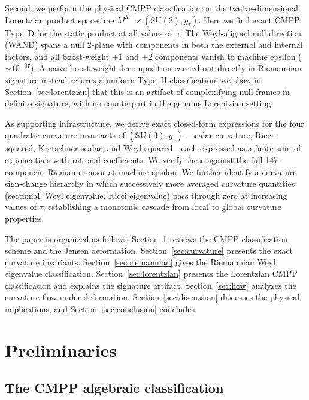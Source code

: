 \documentclass[12pt]{article}
\theoremstyle{definition}
\theoremstyle{remark}
\begin{document}
Second, we perform the physical CMPP classification on the twelve-dimensional Lorentzian product spacetime $M^{3,1}\times(\mathrm{SU}(3),g_\tau)$.  Here we find exact CMPP Type~D for the static product at all values of~$\tau$.  The Weyl-aligned null direction (WAND) spans a null 2-plane with components in both the external and internal factors, and all boost-weight $\pm1$ and $\pm2$ components vanish to machine epsilon ($\sim10^{-67}$).  A naive boost-weight decomposition carried out directly in Riemannian signature instead returns a uniform Type~II classification; we show in Section~\ref{sec:lorentzian} that this is an artifact of complexifying null frames in definite signature, with no counterpart in the genuine Lorentzian setting.

As supporting infrastructure, we derive exact closed-form expressions for the four quadratic curvature invariants of $(\mathrm{SU}(3),g_\tau)$---scalar curvature, Ricci-squared, Kretschner scalar, and Weyl-squared---each expressed as a finite sum of exponentials with rational coefficients.  We verify these against the full 147-component Riemann tensor at machine epsilon.  We further identify a curvature sign-change hierarchy in which successively more averaged curvature quantities (sectional, Weyl eigenvalue, Ricci eigenvalue) pass through zero at increasing values of $\tau$, establishing a monotonic cascade from local to global curvature properties.

The paper is organized as follows.  Section~\ref{sec:prelim} reviews the CMPP classification scheme and the Jensen deformation.  Section~\ref{sec:curvature} presents the exact curvature invariants.  Section~\ref{sec:riemannian} gives the Riemannian Weyl eigenvalue classification.  Section~\ref{sec:lorentzian} presents the Lorentzian CMPP classification and explains the signature artifact.  Section~\ref{sec:flow} analyzes the curvature flow under deformation.  Section~\ref{sec:discussion} discusses the physical implications, and Section~\ref{sec:conclusion} concludes.

\section{Preliminaries}
\label{sec:prelim}

\subsection{The CMPP algebraic classification}
\end{document}
